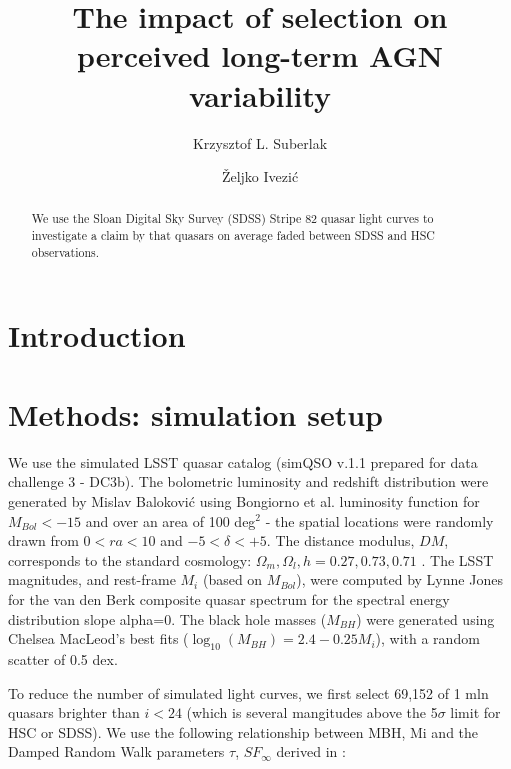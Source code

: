 \documentclass[twocolumn]{aastex62}
\begin{document}
\title{The impact of selection on perceived long-term AGN variability}


\author[0000-0002-9589-1306]{Krzysztof L. Suberlak}


\author[0000-0001-5250-2633]{\v{Z}eljko Ivezi\'c}


\begin{abstract}

We use the Sloan Digital Sky Survey (SDSS) Stripe 82 quasar light curves to investigate a claim by \citet{caplar2020} that quasars on average faded between SDSS and HSC observations.

\end{abstract}


\section{Introduction}
\label{sec:introduction}
%
%
%
\section{Methods: simulation setup}
\label{sec:methods}

We use the simulated LSST quasar catalog (simQSO v.1.1 prepared for data challenge 3 - DC3b). The bolometric luminosity and redshift distribution were generated by Mislav Balokovi{\'c} using Bongiorno et al. luminosity function for $M_{Bol} < -15$ and over an area of 100 deg$^{2}$ - the spatial locations were randomly drawn from $0<ra<10$ and $-5<\delta<+5$. The distance modulus, $DM$, corresponds to the standard cosmology: $\Omega_{m}, \Omega_{l}, h =0.27, 0.73, 0.71$ . The LSST magnitudes, and rest-frame $M_{i}$ (based on $M_{Bol}$), were computed by Lynne Jones for the van den Berk composite quasar  spectrum for the spectral energy distribution slope alpha=0. The black hole masses ($M_{BH}$) were generated using Chelsea MacLeod's best fits ($\log_{10}{(M_{BH})} = 2.4 - 0.25 M_{i}$), with a random scatter of 0.5 dex.

To reduce the number of simulated light curves, we first select  69,152 of 1 mln quasars brighter than $i<24$ (which is several mangitudes above the 5$\sigma$ limit for HSC or SDSS). We use the following relationship between MBH, Mi and the Damped Random Walk parameters $\tau$, $SF_{\infty}$ derived in \cite{macleod2010}:
\end{document}
